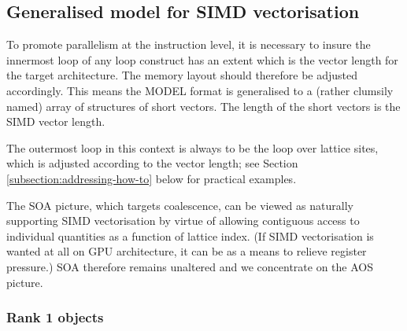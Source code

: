 \subsection{Generalised model for SIMD vectorisation}

To promote parallelism at the instruction level, it is necessary to
insure the innermost loop of any loop construct has an extent which
is the vector length for the target architecture. The memory layout
should therefore be adjusted accordingly. This means the MODEL format
is generalised to a (rather clumsily named) array of structures of
short vectors. The length of the short vectors is the SIMD vector
length.

The outermost loop in this context is always to be the loop over
lattice sites, which is adjusted according to the vector length;
see Section \ref{subsection:addressing-how-to} below for practical
examples.

The SOA picture, which targets coalescence, can be viewed as
naturally supporting SIMD vectorisation by virtue of allowing
contiguous access to individual quantities as a function of lattice
index. (If SIMD vectorisation is wanted at all on GPU architecture,
it can be as a means to relieve register pressure.) SOA therefore
remains unaltered and we concentrate on the AOS picture.

\subsubsection{Rank 1 objects}

